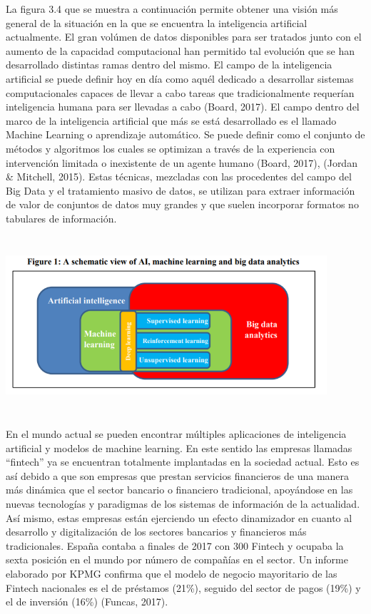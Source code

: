 \documentclass[]{DissertateUSU}
\begin{document}
\setlength\parskip{5ex}
\justifying

\noindent La figura 3.4 que se muestra a continuación permite obtener
una visión más general de la situación en la que se encuentra la
inteligencia artificial actualmente. El gran volúmen de datos
disponibles para ser tratados junto con el aumento de la capacidad
computacional han permitido tal evolución que se han desarrollado
distintas ramas dentro del mismo. El campo de la inteligencia artificial
se puede definir hoy en día como aquél dedicado a desarrollar sistemas
computacionales capaces de llevar a cabo tareas que tradicionalmente
requerían inteligencia humana para ser llevadas a cabo (Board, 2017). El
campo dentro del marco de la inteligencia artificial que más se está
desarrollado es el llamado Machine Learning o aprendizaje automático. Se
puede definir como el conjunto de métodos y algoritmos los cuales se
optimizan a través de la experiencia con intervención limitada o
inexistente de un agente humano (Board, 2017), (Jordan \& Mitchell,
2015). Estas técnicas, mezcladas con las procedentes del campo del Big
Data y el tratamiento masivo de datos, se utilizan para extraer
información de valor de conjuntos de datos muy grandes y que suelen
incorporar formatos no tabulares de información.

\centering

\includegraphics[width=4.6875in,height=2.60417in]{schemaAI.png}
\centering
{}

\setlength\parskip{5ex}
\justifying

\noindent En el mundo actual se pueden encontrar múltiples aplicaciones
de inteligencia artificial y modelos de machine learning. En este
sentido las empresas llamadas ``fintech'' ya se encuentran totalmente
implantadas en la sociedad actual. Esto es así debido a que son empresas
que prestan servicios financieros de una manera más dinámica que el
sector bancario o financiero tradicional, apoyándose en las nuevas
tecnologías y paradigmas de los sistemas de información de la
actualidad. Así mismo, estas empresas están ejerciendo un efecto
dinamizador en cuanto al desarrollo y digitalización de los sectores
bancarios y financieros más tradicionales. España contaba a finales de
2017 con 300 Fintech y ocupaba la sexta posición en el mundo por número
de compañías en el sector. Un informe elaborado por KPMG confirma que el
modelo de negocio mayoritario de las Fintech nacionales es el de
préstamos (21\%), seguido del sector de pagos (19\%) y el de inversión
(16\%) (Funcas, 2017).
\end{document}
